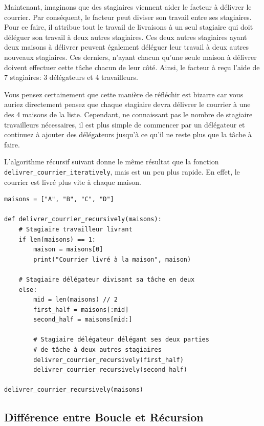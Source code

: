 Maintenant, imaginons que des stagiaires viennent aider le facteur à délivrer le courrier. Par conséquent, le facteur peut diviser son travail entre ses stagiaires. Pour ce faire, il attribue tout le travail de livraisons à un seul stagiaire qui doit déléguer son travail à deux autres stagiaires. Ces deux autres stagiaires ayant deux maisons à délivrer peuvent également déléguer leur travail à deux autres nouveaux stagiaires. Ces derniers, n'ayant chacun qu'une seule maison à délivrer doivent effectuer cette tâche chacun de leur côté. Ainsi, le facteur à reçu l'aide de 7 stagiaires: 3 délégateurs et 4 travailleurs. 

Vous pensez certainement que cette manière de réfléchir est bizarre car vous auriez directement pensez que chaque stagiaire devra délivrer le courrier à une des 4 maisons de la liste. Cependant, ne connaissant pas le nombre de stagiaire travailleurs nécessaires, il est plus simple de commencer par un délégateur et continuez à ajouter des délégateurs jusqu'à ce qu'il ne reste plus que la tâche à faire. 

L'algorithme récursif suivant donne le même résultat que la fonction \lstinline{delivrer_courrier_iteratively}, mais est un peu plus rapide. En effet, le courrier est livré plus vite à chaque maison. 

\begin{verbatim}
maisons = ["A", "B", "C", "D"]

def delivrer_courrier_recursively(maisons):
    # Stagiaire travailleur livrant
    if len(maisons) == 1:
        maison = maisons[0]
        print("Courrier livré à la maison", maison)

    # Stagiaire délégateur divisant sa tâche en deux
    else:
        mid = len(maisons) // 2
        first_half = maisons[:mid]
        second_half = maisons[mid:]

        # Stagiaire délégateur délégant ses deux parties 
        # de tâche à deux autres stagiaires
        delivrer_courrier_recursively(first_half)
        delivrer_courrier_recursively(second_half)
        
delivrer_courrier_recursively(maisons)
\end{verbatim}

\subsection{Différence entre Boucle et Récursion}

